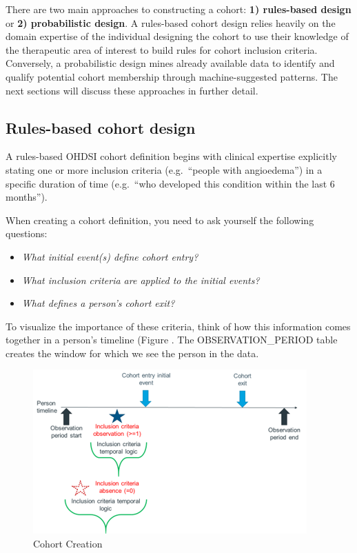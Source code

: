 \documentclass[11pt]{book}
\providecommand{\tightlist}{%
  \setlength{\itemsep}{0pt}\setlength{\parskip}{0pt}}
\theoremstyle{definition}
\theoremstyle{definition}
\theoremstyle{definition}
\theoremstyle{remark}
\begin{document}
There are two main approaches to constructing a cohort: \textbf{1) rules-based design} or \textbf{2) probabilistic design}. A rules-based cohort design relies heavily on the domain expertise of the individual designing the cohort to use their knowledge of the therapeutic area of interest to build rules for cohort inclusion criteria. Conversely, a probabilistic design mines already available data to identify and qualify potential cohort membership through machine-suggested patterns. The next sections will discuss these approaches in further detail.

\hypertarget{rules-based-cohort-design}{%
\subsection{Rules-based cohort design}\label{rules-based-cohort-design}}

A rules-based OHDSI cohort definition begins with clinical expertise explicitly stating one or more inclusion criteria (e.g.~``people with angioedema'') in a specific duration of time (e.g.~``who developed this condition within the last 6 months'').

When creating a cohort definition, you need to ask yourself the following questions:

\begin{itemize}
\tightlist
\item
  \emph{What initial event(s) define cohort entry?}
\item
  \emph{What inclusion criteria are applied to the initial events?}
\item
  \emph{What defines a person's cohort exit?}
\end{itemize}

To visualize the importance of these criteria, think of how this information comes together in a person's timeline (Figure . The OBSERVATION\_PERIOD table creates the window for which we see the person in the data.

\begin{figure}

{\centering \includegraphics[width=0.9\linewidth]{images/Cohorts/cohort-build} 

}

\caption{Cohort Creation}\label{fig:cohortBuild}
\end{figure}
\end{document}
